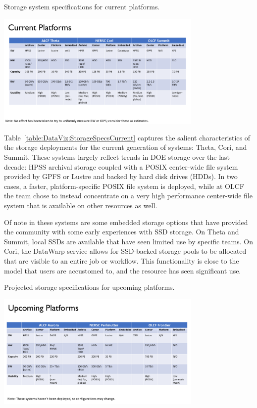 %
%
\begin{table}[htb!]
	\vspace{-2mm}
	\centering
	\caption{\label{table:DataViz:StorageSpecsCurrent} Storage system specifications for current platforms.}
	\includegraphics[width=0.75\textwidth]{projects/2.3.4-DataViz/DataViz-storage-specs-current.pdf}
\end{table}

Table~\ref{table:DataViz:StorageSpecsCurrent} captures the salient
characteristics of the storage deployments for the current generation of
systems: Theta, Cori, and Summit. These systems largely reflect trends in DOE
storage over the last decade: HPSS archival storage coupled with a POSIX
center-wide file system provided by GPFS or Lustre and backed by hard disk
drives (HDDs). In two cases, a faster, platform-specific POSIX file system is 
deployed, while at OLCF the team chose to instead concentrate on a very high
performance center-wide file system that is available on other resources as well.

Of note in these systems are some embedded storage options that have
provided the community with some early experiences with SSD storage. On
Theta and Summit, local SSDs are available that have seen limited use
by specific teams. On Cori, the DataWarp service allows for SSD-backed
storage pools to be allocated that are visible to an entire job or
workflow. This functionality is close to the model that users are
accustomed to, and the resource has seen significant use.

%
%
\begin{table}[htb!]
	\vspace{-2mm}
	\centering
	\caption{\label{table:DataViz:StorageSpecsNext} Projected storage specifications for upcoming platforms.}
	\includegraphics[width=0.75\textwidth]{projects/2.3.4-DataViz/DataViz-storage-specs-next.pdf}
\end{table}

